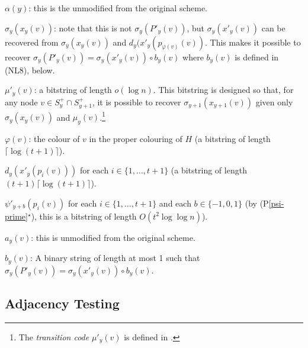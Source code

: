 \documentclass{patmorin}
\newcommand{\psref}[1]{(P\ref{#1}$^{\star}$)}
\begin{document}
\begin{compactenum}[(NL1)]
    \item $\alpha(y)$: this is the unmodified from the original scheme.

    \item $\sigma_y(x_y(v))$: note that this is not $\sigma_y(P'_y(v))$, but
    $\sigma_y(x'_y(v))$ can be recovered from $\sigma_y(x_y(v))$ and $d_y(x'_y(p_{\varphi(v)}(v))$. This makes it possible to recover $\sigma_y(P'_y(v))=\sigma_y(x'_y(v))\mathbin{\circ} b_y(v)$ where $b_y(v)$ is defined in (NL8), below.

    \item $\mu'_y(v)$: a bitstring of length $o(\log n)$.  This bitstring is designed so that, for any node $v\in S^+_y\cap S^+_{y+1}$, it is possible to recover $\sigma_{y+1}(x_{y+1}(v))$ given only $\sigma_y(x_y(v))$ and $\mu_y(v)$.\footnote{The \emph{transition code} $\mu'_y(v)$ is defined in \cite[Section~5.3]{dujmovic.esperet.ea:adjacency}.}

    \item $\varphi(v)$: the colour of $v$ in the proper colouring of $H$ (a bitstring of length $\lceil\log(t+1)\rceil$).

    \item $d_y(x'_y(p_i(v)))$ for each $i\in\{1,\ldots,t+1\}$ (a bitstring of length $(t+1)\lceil\log(t+1)\rceil$).

    \item $\psi'_{y+b}(p_i(v))$ for each $i\in\{1,\ldots,t+1\}$ and each $b\in\{-1,0,1\}$ (by \psref{psi-prime}, this is a bitstring of length $O(t^2\log\log n)$).\label{psi-prime}

    \item $a_y(v)$: this is unmodified from the original scheme.

    \item $b_y(v)$: A binary string of length at most 1 such that $\sigma_y(P'_y(v))=\sigma_y(x'_y(v))\mathbin{\circ}b_y(v)$.
\end{compactenum}

\subsection{Adjacency Testing}
\end{document}
